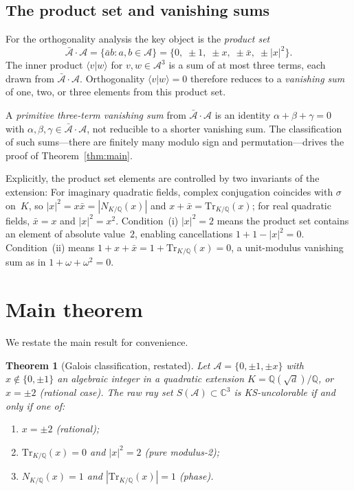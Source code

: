 \documentclass[12pt,a4paper]{article}
\newtheorem{theorem}{Theorem}
\newcommand{\C}{\mathbb{C}}
\newcommand{\Q}{\mathbb{Q}}
\newcommand{\Norm}[1]{N_{K/\Q}\!\left(#1\right)}
\newcommand{\Tr}[1]{\mathrm{Tr}_{K/\Q}\!\left(#1\right)}
\newcommand{\braket}[2]{\langle #1 | #2 \rangle}
\begin{document}
\subsection{The product set and vanishing sums}

For the orthogonality analysis the key object is the \emph{product set}
\[
  \bar{\mathcal{A}} \cdot \mathcal{A}
  = \{\bar{a} b : a, b \in \mathcal{A}\}
  = \{0,\; \pm 1,\; \pm x,\; \pm \bar{x},\; \pm |x|^2\}.
\]
The inner product $\braket{v}{w}$ for $v, w \in \mathcal{A}^3$ is a sum
of at most three terms, each drawn from $\bar{\mathcal{A}} \cdot
\mathcal{A}$.  Orthogonality $\braket{v}{w} = 0$ therefore reduces to a
\emph{vanishing sum} of one, two, or three elements from this product
set.

A \emph{primitive three-term vanishing sum} from
$\bar{\mathcal{A}} \cdot \mathcal{A}$ is an identity
$\alpha + \beta + \gamma = 0$ with $\alpha, \beta, \gamma \in
\bar{\mathcal{A}} \cdot \mathcal{A}$, not reducible to a shorter
vanishing sum.  The classification of such sums---there are finitely many
modulo sign and permutation---drives the proof of
Theorem~\ref{thm:main}.

Explicitly, the product set elements are controlled by two invariants of
the extension:
For imaginary quadratic fields, complex conjugation coincides with
$\sigma$ on~$K$, so $|x|^2 = x\bar{x} = |\Norm{x}|$ and $x + \bar{x}
= \Tr{x}$; for real quadratic fields, $\bar{x} = x$ and $|x|^2 = x^2$.
Condition~(i) $|x|^2 = 2$ means the product set contains an element of
absolute value~$2$, enabling cancellations $1 + 1 - |x|^2 = 0$.
Condition~(ii) means $1 + x + \bar{x} = 1 + \Tr{x} = 0$, a
unit-modulus vanishing sum as in $1 + \omega + \omega^2 = 0$.

\section{Main theorem}\label{sec:proof}

We restate the main result for convenience.

\begin{theorem}[Galois classification, restated]\label{thm:galois}
Let $\mathcal{A} = \{0,\pm 1,\pm x\}$ with $x \notin \{0,\pm 1\}$ an
algebraic integer in a quadratic extension $K = \Q(\sqrt d)/\Q$, or
$x = \pm 2$ (rational case).  The raw ray set
$S(\mathcal{A}) \subset \C^3$ is KS-uncolorable if and only if one of:
\begin{enumerate}
  \item[\emph{(R)}]  $x = \pm 2$ \emph{(rational)};
  \item[\emph{(i)}]  $\Tr{x} = 0$ and $|x|^2 = 2$ \emph{(pure modulus-2)};
  \item[\emph{(ii)}] $\Norm{x} = 1$ and $|\Tr{x}| = 1$ \emph{(phase)}.
\end{enumerate}
\end{theorem}
\end{document}
